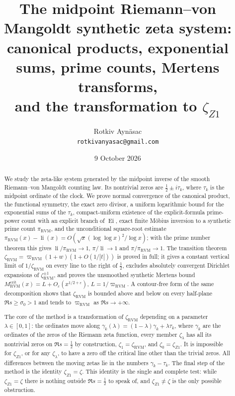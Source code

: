 \documentclass[11pt,reqno]{amsart}
\numberwithin{equation}{section}
\theoremstyle{plain}
\theoremstyle{definition}
\theoremstyle{remark}
\newcommand{\eps}{\varepsilon}
\newcommand{\li}{\operatorname{li}}
\newcommand{\Ei}{\operatorname{Ei}}
\newcommand{\RVM}{\mathrm{RVM}}
\newcommand{\crit}{\mathrm{crit}}
\providecommand{\NoCaseChange}[1]{\lowercase{#1}}
\begin{document}
\title[The midpoint RVM synthetic zeta system]{The midpoint Riemann--von Mangoldt synthetic zeta system:\\
canonical products, exponential sums, prime counts, Mertens transforms,\\
and the transformation to $\zeta_{Z1}$}
\author{Rotkiv Ayn\"asac\\[2pt]\NoCaseChange{\normalfont\texttt{rotkivanyasac@gmail.com}}}
\date{9 October 2026}

\begin{abstract}
We study the zeta-like system generated by the midpoint inverse of the smooth Riemann--von Mangoldt counting law.  Its nontrivial zeros are $\tfrac12\pm i\tau_k$, where $\tau_k$ is the midpoint ordinate of the clock.  We prove normal convergence of the canonical product, the functional symmetry, the exact zero divisor, a uniform logarithmic bound for the exponential sums of the $\tau_k$, compact-uniform existence of the explicit-formula prime-power count with an explicit branch of $\Ei$, exact finite M\"obius inversion to a synthetic prime count $\pi_{\RVM}$, and the unconditional square-root estimate $\pi_{\RVM}(x)-\li(x)=O(\sqrt x(\log\log x)^2/\log x)$; with the prime number theorem this gives $\li/\pi_{\RVM}\to1$, $\pi/\li\to1$ and $\pi/\pi_{\RVM}\to1$.  The transition theorem $\zeta_{\RVM}=\varpi_{\RVM}(1+w)(1+O(1/|t|))$ is proved in full; it gives a constant vertical limit of $1/\zeta_{\RVM}$ on every line to the right of $\tfrac12$, excludes absolutely convergent Dirichlet expansions of $\zeta_{\RVM}^{\pm1}$, and proves the unsmoothed synthetic Mertens bound $M_{\RVM}^{\crit}(x)=L+O_\eps(x^{1/2+\eps})$, $L=1/\varpi_{\RVM}$.  A contour-free form of the same decomposition shows that $\zeta_{\RVM}$ is bounded above and below on every half-plane $\Re s\ge\sigma_0>1$ and tends to $\varpi_{\RVM}$ as $\Re s\to+\infty$.

The core of the method is a transformation of $\zeta_{\RVM}$ depending on a parameter $\lambda\in[0,1]$: the ordinates move along $\gamma_k(\lambda)=(1-\lambda)\gamma_k+\lambda\tau_k$, where $\gamma_k$ are the ordinates of the zeros of the Riemann zeta function, every member $\zeta_\lambda$ has all its nontrivial zeros on $\Re s=\tfrac12$ by construction, $\zeta_1=\zeta_{\RVM}$, and $\zeta_0=\zeta_{Z1}$.  It is impossible for $\zeta_{Z1}$, or for any $\zeta_\lambda$, to have a zero off the critical line other than the trivial zeros.  All differences between the moving zetas lie in the numbers $\gamma_k-\tau_k$.  The final step of the method is the identity $\zeta_{Z1}=\zeta$.  This identity is the single and complete test: while $\zeta_{Z1}=\zeta$ there is nothing outside $\Re s=\tfrac12$ to speak of, and $\zeta_{Z1}\neq\zeta$ is the only possible obstruction.


\end{abstract}
\end{document}
